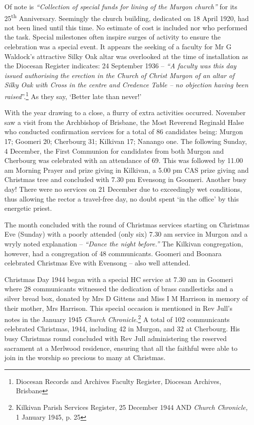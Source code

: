 Of note is \emph{``Collection of special funds for lining of the Murgon church''} for its 25\textsuperscript{th} Anniversary. Seemingly the church building, dedicated on 18 April 1920, had not been lined until this time. No estimate of cost is included nor who performed the task. Special milestones often inspire surges of activity to ensure the celebration was a special event. It appears the seeking of a faculty for Mr G Waldock's attractive Silky Oak altar was overlooked at the time of installation as the Diocesan Register indicates: 24 September 1936 -- \emph{``A faculty was this day issued authorising the erection in the Church of Christ Murgon of an altar of Silky Oak with Cross in the centre and Credence Table -- no objection having been raised}''.\footnote{Diocesan Records and Archives Faculty Register, Diocesan Archives, Brisbane} As they say, `Better late than never!'


With the year drawing to a close, a flurry of extra activities occurred. November saw a visit from the Archbishop of Brisbane, the Most Reverend Reginald Halse who conducted confirmation services for a total of 86 candidates being: Murgon 17; Goomeri 20; Cherbourg 31; Kilkivan 17; Nanango one. The following Sunday, 4 December, the First Communion for candidates from both Murgon and Cherbourg was celebrated with an attendance of 69. This was followed by 11.00 am Morning Prayer and prize giving in Kilkivan, a 5.00 pm CAS prize giving and Christmas tree and concluded with 7.30 pm Evensong in Goomeri. Another busy day! There were no services on 21 December due to exceedingly wet conditions, thus allowing the rector a travel-free day, no doubt spent `in the office' by this energetic priest.



The month concluded with the round of Christmas services starting on Christmas Eve (Sunday) with a poorly attended (only six) 7.30 am service in Murgon and a wryly noted explanation -- \emph{``Dance the night before.''} The Kilkivan congregation, however, had a congregation of 48 communicants. Goomeri and Boonara celebrated Christmas Eve with Evensong -- also well attended.



Christmas Day 1944 began with a special HC service at 7.30 am in Goomeri where 28 communicants witnessed the dedication of brass candlesticks and a silver bread box, donated by Mrs D Gittens and Miss I M Harrison in memory of their mother, Mrs Harrison. This special occasion is mentioned in Rev Jull's notes in the January 1945 \emph{Church Chronicle}.\footnote{Kilkivan Parish Services Register, 25 December 1944 AND \emph{Church Chronicle,} 1 January 1945, p. 25} A total of 102 communicants celebrated Christmas, 1944, including 42 in Murgon, and 32 at Cherbourg. His busy Christmas round concluded with Rev Jull administering the reserved sacrament at a Merlwood residence, ensuring that all the faithful were able to join in the worship so precious to many at Christmas.


